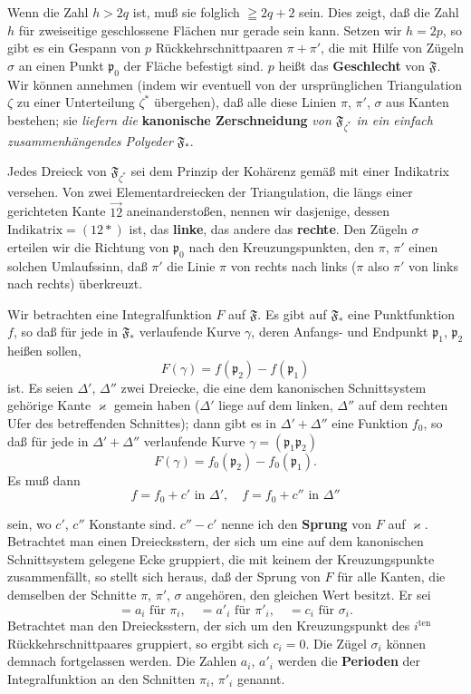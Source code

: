 \documentclass{article}
\begin{document}

Wenn die Zahl $h > 2q$ ist, muß sie folglich $\geqq 2q + 2$ sein. Dies zeigt, daß die Zahl $h$ für zweiseitige geschlossene Flächen nur gerade sein kann. Setzen wir $h = 2p$, so gibt es ein Gespann von $p$ Rückkehrschnittpaaren $\pi + \pi'$, die mit Hilfe von Zügeln $\sigma$ an einen Punkt $\mathfrak{p}_0$ der Fläche befestigt sind. $p$ heißt das \textbf{Geschlecht} von $\mathfrak{F}$. Wir können annehmen (indem wir eventuell von der ursprünglichen Triangulation $\zeta$ zu einer Unterteilung $\zeta^*$ übergehen), daß alle diese Linien $\pi$, $\pi'$, $\sigma$ aus Kanten bestehen; sie \emph{liefern die} \textbf{kanonische Zerschneidung} \emph{von $\mathfrak{F}_{\zeta^*}$ in ein einfach zusammenhängendes Polyeder} $\mathfrak{F}_*$.

Jedes Dreieck von $\mathfrak{F}_{\zeta^*}$ sei dem Prinzip der Kohärenz gemäß mit einer Indikatrix versehen. Von zwei Elementardreiecken der Triangulation, die längs einer gerichteten Kante $\overrightarrow{12}$ aneinanderstoßen, nennen wir dasjenige, dessen $\text{Indikatrix} = (12*)$ ist, das \textbf{linke}, das andere das \textbf{rechte}. Den Zügeln $\sigma$ erteilen wir die Richtung von $\mathfrak{p}_0$ nach den Kreuzungspunkten, den $\pi$, $\pi'$ einen solchen Umlaufssinn, daß $\pi'$ die Linie $\pi$ von rechts nach links ($\pi$ also $\pi'$ von links nach rechts) überkreuzt.

Wir betrachten eine Integralfunktion $F$ auf $\mathfrak{F}$. Es gibt auf $\mathfrak{F}_*$ eine Punktfunktion $f$, so daß für jede in $\mathfrak{F}_*$ verlaufende Kurve $\gamma$, deren Anfangs- und Endpunkt $\mathfrak{p}_1$, $\mathfrak{p}_2$ heißen sollen,
\[ F(\gamma) = f(\mathfrak{p}_2) - f(\mathfrak{p}_1) \]
ist. Es seien $\Delta'$, $\Delta''$ zwei Dreiecke, die eine dem kanonischen Schnittsystem gehörige Kante $\varkappa$ gemein haben ($\Delta'$ liege auf dem linken, $\Delta''$ auf dem rechten Ufer des betreffenden Schnittes); dann gibt es in $\Delta' + \Delta''$ eine Funktion $f_0$, so daß für jede in $\Delta' + \Delta''$ verlaufende Kurve $\gamma = (\mathfrak{p}_1 \mathfrak{p}_2)$
\[ F(\gamma) = f_0(\mathfrak{p}_2) - f_0(\mathfrak{p}_1). \]
Es muß dann
\[ f = f_0 + c' \text{ in } \Delta', \quad f = f_0 + c'' \text{ in } \Delta'' \]

sein, wo $c'$, $c''$ Konstante sind. $c'' - c'$ nenne ich den \textbf{Sprung} von $F$ auf $\varkappa$. Betrachtet man einen Dreiecksstern, der sich um eine auf dem kanonischen Schnittsystem gelegene Ecke gruppiert, die mit keinem der Kreuzungspunkte zusammenfällt, so stellt sich heraus, daß der Sprung von $F$ für alle Kanten, die demselben der Schnitte $\pi$, $\pi'$, $\sigma$ angehören, den gleichen Wert besitzt. Er sei
\[ = a_i \text{ für } \pi_i, \quad = a'_i \text{ für } \pi'_i, \quad = c_i \text{ für } \sigma_i. \]
Betrachtet man den Dreiecksstern, der sich um den Kreuzungspunkt des $i^{\text{ten}}$ Rückkehrschnittpaares gruppiert, so ergibt sich $c_i = 0$. Die Zügel $\sigma_i$ können demnach fortgelassen werden. Die Zahlen $a_i$, $a'_i$ werden die \textbf{Perioden} der Integralfunktion an den Schnitten $\pi_i$, $\pi'_i$ genannt.
\end{document}
